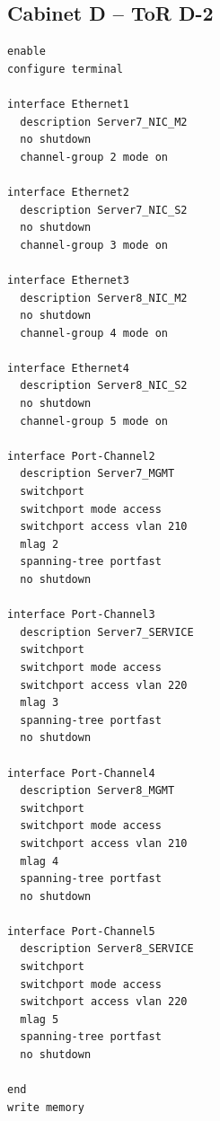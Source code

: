 \subsection{Cabinet D -- ToR D-2}
\begin{lstlisting}[caption={ToR D-2: downlinks to Servers 7 and 8 (DMZ, backup NICs).},basicstyle=\ttfamily\footnotesize,breaklines=true]
enable
configure terminal

interface Ethernet1
  description Server7_NIC_M2
  no shutdown
  channel-group 2 mode on

interface Ethernet2
  description Server7_NIC_S2
  no shutdown
  channel-group 3 mode on

interface Ethernet3
  description Server8_NIC_M2
  no shutdown
  channel-group 4 mode on

interface Ethernet4
  description Server8_NIC_S2
  no shutdown
  channel-group 5 mode on

interface Port-Channel2
  description Server7_MGMT
  switchport
  switchport mode access
  switchport access vlan 210
  mlag 2
  spanning-tree portfast
  no shutdown

interface Port-Channel3
  description Server7_SERVICE
  switchport
  switchport mode access
  switchport access vlan 220
  mlag 3
  spanning-tree portfast
  no shutdown

interface Port-Channel4
  description Server8_MGMT
  switchport
  switchport mode access
  switchport access vlan 210
  mlag 4
  spanning-tree portfast
  no shutdown

interface Port-Channel5
  description Server8_SERVICE
  switchport
  switchport mode access
  switchport access vlan 220
  mlag 5
  spanning-tree portfast
  no shutdown

end
write memory
\end{lstlisting}




